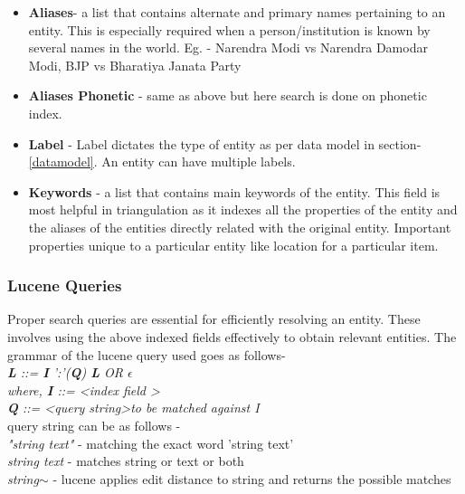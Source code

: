 \begin{itemize}
    
    \item \textbf{Aliases}- a list that contains alternate and primary names pertaining to an entity. This is especially required when a person/institution is known by several names in the world. Eg. - Narendra Modi vs Narendra Damodar Modi, BJP vs Bharatiya Janata Party

    \item \textbf{ Aliases  Phonetic } - same as above but here search is done on phonetic index.

    \item \textbf{Label} - Label dictates the type of entity as per data model in section- \ref{datamodel}. An entity can have multiple labels.

    \item \textbf{ Keywords } - a list that contains main keywords of the entity. This field is most helpful in triangulation as it indexes all the properties of the entity and the aliases of the entities directly related with the original entity. Important properties unique to a particular entity like location for a particular item.
\end{itemize}

\subsubsection{Lucene Queries}
    Proper search queries are essential for efficiently resolving an entity. These involves using the above indexed fields effectively to obtain relevant entities. The grammar of the lucene query used goes as follows-\\

        \emph{ \textbf{ L } ::=   \textbf{ I }':'(\textbf{Q}) \textbf{L}  OR $\epsilon$ } \\
       \emph{ where,  \textbf{I} ::= \textless index field \textgreater  }\\
        \emph{ \textbf{Q} ::= \textless query string\textgreater to be matched against I } \\

    query string can be as follows -\\
    
    \emph{"string text"} - matching the exact word 'string text'\\
    \emph{ string text } - matches string or text or both \\
    \emph{ string$\sim$ } - lucene applies edit distance to string and returns the possible matches \\
    
